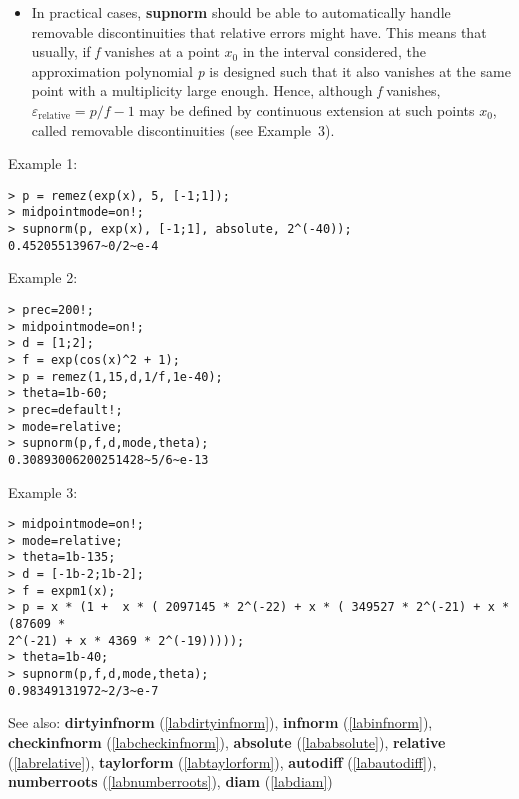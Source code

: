 \begin{itemize}
\item In practical cases, \textbf{supnorm} should be able to automatically handle
   removable discontinuities that relative errors might have. This means
   that usually, if \emph{f} vanishes at a point $x_0$ in the interval
   considered, the approximation polynomial \emph{p} is designed such that it
   also vanishes at the same point with a multiplicity large
   enough. Hence, although \emph{f} vanishes, $\varepsilon_{\textrm{relative}}=p/f-1$ may be 
   defined by continuous extension at such points $x_0$, called 
   removable discontinuities (see Example~$3$).
\end{itemize}
\noindent Example 1: 
\begin{center}\begin{minipage}{15cm}\begin{Verbatim}[frame=single]
> p = remez(exp(x), 5, [-1;1]);
> midpointmode=on!;
> supnorm(p, exp(x), [-1;1], absolute, 2^(-40));
0.45205513967~0/2~e-4
\end{Verbatim}
\end{minipage}\end{center}
\noindent Example 2: 
\begin{center}\begin{minipage}{15cm}\begin{Verbatim}[frame=single]
> prec=200!;
> midpointmode=on!;
> d = [1;2];
> f = exp(cos(x)^2 + 1);
> p = remez(1,15,d,1/f,1e-40);
> theta=1b-60;
> prec=default!;
> mode=relative;
> supnorm(p,f,d,mode,theta);
0.30893006200251428~5/6~e-13
\end{Verbatim}
\end{minipage}\end{center}
\noindent Example 3: 
\begin{center}\begin{minipage}{15cm}\begin{Verbatim}[frame=single]
> midpointmode=on!;
> mode=relative;
> theta=1b-135;
> d = [-1b-2;1b-2];
> f = expm1(x);
> p = x * (1 +  x * ( 2097145 * 2^(-22) + x * ( 349527 * 2^(-21) + x * (87609 * 
2^(-21) + x * 4369 * 2^(-19))))); 
> theta=1b-40;
> supnorm(p,f,d,mode,theta);
0.98349131972~2/3~e-7
\end{Verbatim}
\end{minipage}\end{center}
See also: \textbf{dirtyinfnorm} (\ref{labdirtyinfnorm}), \textbf{infnorm} (\ref{labinfnorm}), \textbf{checkinfnorm} (\ref{labcheckinfnorm}), \textbf{absolute} (\ref{lababsolute}), \textbf{relative} (\ref{labrelative}), \textbf{taylorform} (\ref{labtaylorform}), \textbf{autodiff} (\ref{labautodiff}), \textbf{numberroots} (\ref{labnumberroots}), \textbf{diam} (\ref{labdiam})
